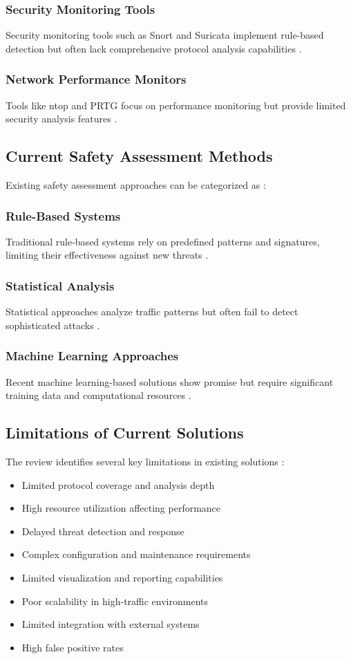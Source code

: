 \documentclass[conference]{IEEEtran}
\begin{document}
\subsubsection{Security Monitoring Tools}
Security monitoring tools such as Snort and Suricata implement rule-based detection but often lack comprehensive protocol analysis capabilities \cite{ref8}.

\subsubsection{Network Performance Monitors}
Tools like ntop and PRTG focus on performance monitoring but provide limited security analysis features \cite{ref9}.

\subsection{Current Safety Assessment Methods}
Existing safety assessment approaches can be categorized as \cite{ref10,ref11}:

\subsubsection{Rule-Based Systems}
Traditional rule-based systems rely on predefined patterns and signatures, limiting their effectiveness against new threats \cite{ref12}.

\subsubsection{Statistical Analysis}
Statistical approaches analyze traffic patterns but often fail to detect sophisticated attacks \cite{ref13}.

\subsubsection{Machine Learning Approaches}
Recent machine learning-based solutions show promise but require significant training data and computational resources \cite{ref14,ref15}.

\subsection{Limitations of Current Solutions}
The review identifies several key limitations in existing solutions \cite{ref1,ref2}:
\begin{itemize}[leftmargin=*]
    \item Limited protocol coverage and analysis depth
    \item High resource utilization affecting performance
    \item Delayed threat detection and response
    \item Complex configuration and maintenance requirements
    \item Limited visualization and reporting capabilities
    \item Poor scalability in high-traffic environments
    \item Limited integration with external systems
    \item High false positive rates
\end{itemize}
\end{document}
